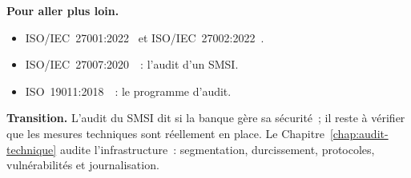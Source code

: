 \bigskip

\begin{boxinfo}
\textbf{Pour aller plus loin.}
\begin{itemize}
    \item ISO/IEC~27001:2022~\cite{iso27001_2022} et
          ISO/IEC~27002:2022~\cite{iso27002_2022}.
    \item ISO/IEC~27007:2020~\cite{iso27007_2020}~: l'audit d'un SMSI.
    \item ISO~19011:2018~\cite{iso19011_2018}~: le programme d'audit.
\end{itemize}
\end{boxinfo}

\begin{boxinfo}
\textbf{Transition.} L'audit du SMSI dit si la banque gère sa sécurité~;
il reste à vérifier que les mesures techniques sont réellement en place.
Le Chapitre~\ref{chap:audit-technique} audite l'infrastructure~:
segmentation, durcissement, protocoles, vulnérabilités et journalisation.
\end{boxinfo}
